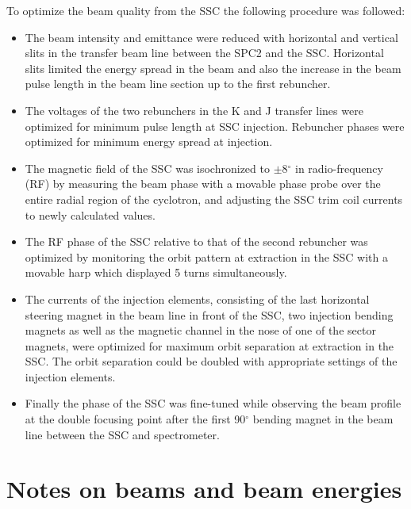 \documentclass[11pt]{report}
\begin{document}
To optimize the beam quality from the SSC the following procedure was followed:
\begin{itemize}
\item The beam intensity and emittance were reduced with horizontal and vertical 
      slits in the transfer beam line between the SPC2 and the SSC. 
      Horizontal slits limited the energy spread in the beam and also the
      increase in the beam pulse length in the beam line section up to the first rebuncher.
\item The voltages of the two rebunchers in the K and J transfer lines were optimized for minimum 
      pulse length at SSC injection.
      Rebuncher phases were optimized for minimum energy spread at injection.
\item The magnetic field of the SSC was isochronized to $\pm$8$^{\circ}$ in radio-frequency (RF) 
      by measuring the beam phase with a movable phase probe over the entire radial region of 
      the cyclotron, and adjusting the SSC trim coil currents to newly calculated values. 
\item The RF phase of the SSC relative to that of the second rebuncher was optimized 
      by monitoring the orbit pattern at extraction in the SSC with a movable 
      harp which displayed 5 turns simultaneously.
\item The currents of the injection elements, consisting of the last horizontal steering magnet 
      in the beam line
      in front of the SSC, two injection bending magnets as well as the magnetic channel in the nose of one
      of the sector magnets, were optimized for maximum orbit separation at extraction in the SSC.
      The orbit separation could be doubled with appropriate settings of the injection elements.
\item Finally the phase of the SSC was fine-tuned while observing the beam profile at the 
      double focusing point after the first 90$^{\circ}$ bending magnet in the beam line
      between the SSC and spectrometer.
\end{itemize}





\section{Notes on beams and beam energies}
\end{document}
